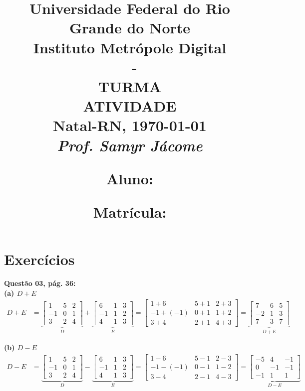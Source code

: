 \documentclass[a4paper,12pt]{article}
\author{}
\date{}
\title{
\vspace{-2cm}
\Large \textbf{Universidade Federal do Rio Grande do Norte}\\ 
Instituto Metrópole Digital \\ 
\coddisciplina $\;$ - \nomedisciplina \\ 
TURMA \codturma \\
\vspace{5mm} \Large\textbf{ATIVIDADE \codatividade} \\
\normalsize Natal-RN, \today\\
\vspace{0.7cm} \large \textit{Prof. Samyr Jácome}\\

\justifying
\vspace{0.5cm} \hspace{-0.82cm}
\begin{minipage}{.6\linewidth}
    \large \textbf{Aluno:} \nomedoaluno
\end{minipage}
\begin{minipage}{.4\linewidth}
    \begin{flushright}
        \large \textbf{Matrícula:} \matricula
    \end{flushright}
\end{minipage}
}
\def\tirarident{\setlength{\parindent}{0cm}} %
\begin{document}
\maketitle

\vspace{-2cm}
\section*{Exercícios}

\tirarident

\textbf{Questão 03, pág. 36:}\\
\textbf{(a) $D + E$}
\begin{align*}
    D + E &=
    \underbrace{
    \begin{bmatrix}
        1 & 5 & 2\\
        -1  & 0 & 1\\
        3 & 2 & 4
    \end{bmatrix}}_{D} +
    \underbrace{
    \begin{bmatrix}
        6 & 1 & 3\\
        -1 & 1  & 2\\
        4 & 1  & 3
    \end{bmatrix}}_{E} 
    =
    \begin{bmatrix}
            1+6 & 5+1 & 2+3\\
            -1+(-1)  & 0+1 &1+2\\
            3+4 & 2+1 & 4+3
    \end{bmatrix}
    =
    \underbrace{\begin{bmatrix}
        7 & 6 & 5\\
        -2 & 1 & 3\\
        7 & 3 & 7
    \end{bmatrix}}_{D + E}
\end{align*}
    
\textbf{(b) $D - E$}
\begin{align*}
    D - E &=
    \underbrace{
    \begin{bmatrix}
        1 & 5 & 2\\
        -1  & 0 & 1\\
        3 & 2 & 4
    \end{bmatrix}}_{D} -
    \underbrace{
    \begin{bmatrix}
        6 & 1 & 3\\
        -1 & 1  & 2\\
        4 & 1  & 3
    \end{bmatrix}}_{E} 
    =
    \begin{bmatrix}
            1-6 & 5-1 & 2-3\\
            -1-(-1)  & 0-1 &1-2\\
            3-4 & 2-1 & 4-3
    \end{bmatrix}
    =
    \underbrace{\begin{bmatrix}
        -5 & 4 & -1\\
        0 & -1 & -1\\
        -1 & 1 & 1
    \end{bmatrix}}_{D - E}
\end{align*}
\end{document}
